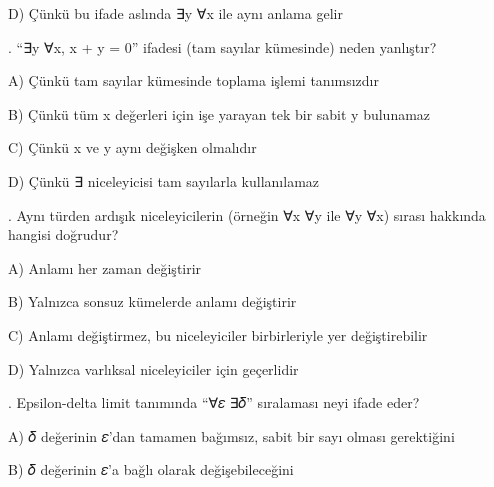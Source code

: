 \par\noindent\hspace*{1.6em}D) Çünkü bu ifade aslında ∃y ∀x ile aynı anlama gelir

\par\smallskip{}. “∃y ∀x, x + y = 0” ifadesi (tam sayılar kümesinde) neden yanlıştır?

\par\noindent\hspace*{1.6em}A) Çünkü tam sayılar kümesinde toplama işlemi tanımsızdır

\par\noindent\hspace*{1.6em}B) Çünkü tüm x değerleri için işe yarayan tek bir sabit y bulunamaz

\par\noindent\hspace*{1.6em}C) Çünkü x ve y aynı değişken olmalıdır

\par\noindent\hspace*{1.6em}D) Çünkü ∃ niceleyicisi tam sayılarla kullanılamaz

\par\smallskip{}. Aynı türden ardışık niceleyicilerin (örneğin ∀x ∀y ile ∀y ∀x) sırası hakkında hangisi doğrudur?

\par\noindent\hspace*{1.6em}A) Anlamı her zaman değiştirir

\par\noindent\hspace*{1.6em}B) Yalnızca sonsuz kümelerde anlamı değiştirir

\par\noindent\hspace*{1.6em}C) Anlamı değiştirmez, bu niceleyiciler birbirleriyle yer değiştirebilir

\par\noindent\hspace*{1.6em}D) Yalnızca varlıksal niceleyiciler için geçerlidir

\par\smallskip{}. Epsilon-delta limit tanımında “∀𝜀 ∃𝛿” sıralaması neyi ifade eder?

\par\noindent\hspace*{1.6em}A) 𝛿 değerinin 𝜀’dan tamamen bağımsız, sabit bir sayı olması gerektiğini

\par\noindent\hspace*{1.6em}B) 𝛿 değerinin 𝜀’a bağlı olarak değişebileceğini

